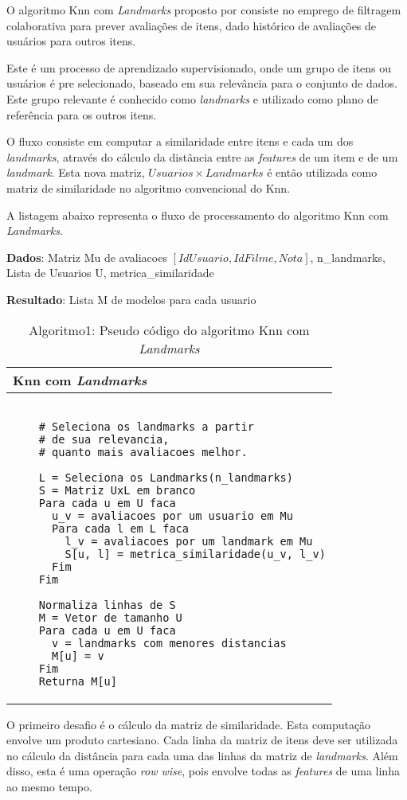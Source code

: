 \documentclass[12pt]{article}
\begin{document}
O algoritmo Knn com \textit{Landmarks} proposto por \cite{lima:18} consiste no emprego de filtragem colaborativa para prever avaliações de itens, dado histórico de avaliações de usuários para outros itens.

Este é um processo de aprendizado supervisionado, onde um grupo de itens ou usuários é pre selecionado, baseado em sua relevância para o conjunto de dados. Este grupo relevante é conhecido como \textit{landmarks} e utilizado como plano de referência para os outros itens.

O fluxo consiste em computar a similaridade entre itens e cada um dos \textit{landmarks}, através do cálculo da distância entre as \textit{features} de um item e de um \textit{landmark}. Esta nova matriz, $Usuarios \times Landmarks$ é então utilizada como matriz de similaridade no algoritmo convencional do Knn.

A listagem abaixo representa o fluxo de processamento do algoritmo Knn com \textit{Landmarks}.

\textbf{Dados}: Matriz Mu de avaliacoes $[IdUsuario, IdFilme, Nota]$, n\_landmarks, 
Lista de Usuarios U, metrica\_similaridade

\textbf{Resultado}: Lista M de modelos para cada usuario

\begin{table}[ht]
	\begin{tabular}{l}
		Knn com \textit{Landmarks} \\ \hline
	\begin{lstlisting}
	
	# Seleciona os landmarks a partir 
	# de sua relevancia, 
	# quanto mais avaliacoes melhor.
	
	L = Seleciona os Landmarks(n_landmarks)
	S = Matriz UxL em branco
	Para cada u em U faca
	  u_v = avaliacoes por um usuario em Mu
	  Para cada l em L faca
	    l_v = avaliacoes por um landmark em Mu
	    S[u, l] = metrica_similaridade(u_v, l_v)
	  Fim
	Fim
	
	Normaliza linhas de S
	M = Vetor de tamanho U
	Para cada u em U faca
	  v = landmarks com menores distancias
	  M[u] = v
	Fim
	Returna M[u]
	\end{lstlisting}	
	\end{tabular}
	\caption{Algoritmo1: Pseudo código do algoritmo Knn com \textit{Landmarks}}
	\label{tab:code1}
\end{table}

O primeiro desafio é o cálculo da matriz de similaridade. Esta computação envolve um produto cartesiano. Cada linha da matriz de itens deve ser utilizada no cálculo da distância para cada uma das linhas da matriz de \textit{landmarks}. Além disso, esta é uma operação \textit{row wise}, pois envolve todas as \textit{features} de uma linha ao mesmo tempo.
\end{document}
